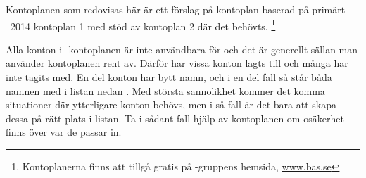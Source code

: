 Kontoplanen som redovisas här är ett förslag på kontoplan baserad på primärt ~2014 kontoplan 1 med stöd av kontoplan 2 där det behövts. \footnote{Kontoplanerna finns att tillgå gratis på -gruppens hemsida, \url{www.bas.se}}

Alla konton i -kontoplanen är inte användbara för  och det är generellt sällan man använder kontoplanen rent av. 
Därför har vissa konton lagts till och många har inte tagits med. En del konton har bytt namn, och i en del fall så står båda namnen med i listan nedan . Med största sannolikhet kommer det komma situationer där ytterligare konton behövs, men i så fall är det bara att skapa dessa på rätt plats i listan. Ta i sådant fall hjälp av  kontoplanen om osäkerhet finns över var de passar in.